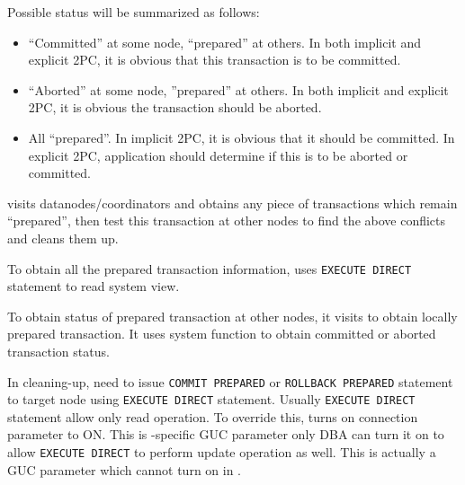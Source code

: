   Possible status will be summarized as follows:
  
  \begin{itemize}
	  \item ``Committed'' at some node, ``prepared'' at others.
	  		In both implicit and explicit 2PC,  it is obvious that this transaction is
			to be committed.
	  \item ``Aborted'' at some node, ''prepared'' at others.
		In both implicit and explicit 2PC, it is obvious the transaction should be aborted.
	  \item All ``prepared''.
		In implicit 2PC, it is obvious that it should be committed.
		In explicit 2PC, application should determine if this is to be aborted or committed.
  \end{itemize}
  
   visits datanodes/coordinators and obtains any piece of transactions which
  remain ``prepared'', then test this transaction at other nodes to find the above conflicts and
  cleans them up.
  
  To obtain all the prepared transaction information,  uses \texttt{EXECUTE DIRECT}
  statement to read  system view.
  
  To obtain status of prepared transaction at other nodes, it visits  to
  obtain locally prepared transaction.
  It uses  system function to obtain committed or aborted
  transaction status.
  
  In cleaning-up,  need to issue \texttt{COMMIT PREPARED} or
  \texttt{ROLLBACK PREPARED} statement to target node using \texttt{EXECUTE DIRECT} statement.
  Usually \texttt{EXECUTE DIRECT} statement allow only read operation.
  To override this,  turns on  connection parameter to ON.
  This is \XC-specific GUC parameter only DBA can turn it on to allow \texttt{EXECUTE DIRECT} to
  perform update operation as well.
  This is actually a GUC parameter which cannot turn on in .

